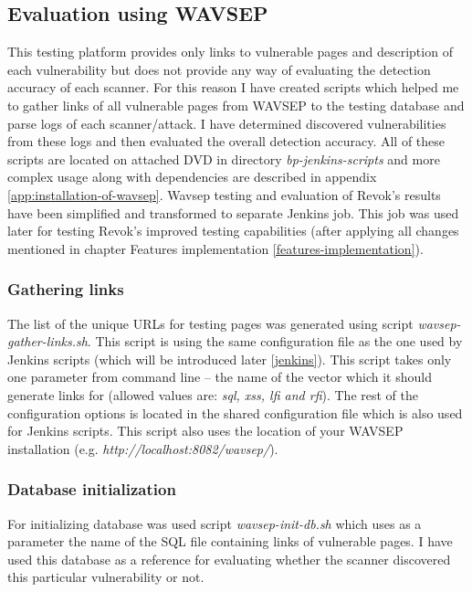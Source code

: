 		\subsection{Evaluation using WAVSEP}
		This testing platform provides only links to vulnerable pages and description of each vulnerability but does not provide any way of evaluating the detection accuracy of each scanner. For this reason I have created scripts which helped me to gather links of all vulnerable pages from WAVSEP to the testing database and parse logs of each scanner/attack. I have determined discovered vulnerabilities from these logs and then evaluated the overall detection accuracy. All of these scripts are located on attached DVD in directory \textit{bp-jenkins-scripts} and more complex usage along with dependencies are described in appendix \ref{app:installation-of-wavsep}. Wavsep testing and evaluation of Revok's results have been simplified and transformed to separate Jenkins job. This job was used later for testing Revok's improved testing capabilities (after applying all changes mentioned in chapter Features implementation \ref{features-implementation}).
		
		\subsubsection{Gathering links}			
		The list of the unique URLs for testing pages was generated using script \textit{wavsep-gather-links.sh}. This script is using the same configuration file as the one used by Jenkins scripts (which will be introduced later \ref{jenkins}). This script takes only one parameter from command line -- the name of the vector which it should generate links for (allowed values are: \textit{sql, xss, lfi and rfi}). The rest of the configuration options is located in the shared configuration file which is also used for Jenkins scripts. This script also uses the location of your WAVSEP installation (e.g. \textit{http://localhost:8082/wavsep/}).
		
		\subsubsection{Database initialization}		
		For initializing database was used script \textit{wavsep-init-db.sh} which uses as a parameter the name of the SQL file containing links of vulnerable pages. I have used this database as a reference for evaluating whether the scanner discovered this particular vulnerability or not.
		
